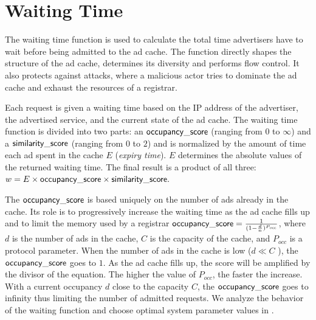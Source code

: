 
\section{Waiting Time}
\label{sec:waitingTime}

The waiting time function is used to calculate the total time advertisers have to wait before being admitted to the ad cache. 
The function directly shapes the structure of the ad cache, determines its diversity and performs flow control. 
It also protects against attacks, where a malicious actor tries to dominate the ad cache and exhaust the resources of a registrar. 

Each request is given a waiting time based on the IP address of the advertiser, the advertised service, and the current state of the ad cache.
The waiting time function is divided into two parts: an $\mathsf{occupancy\_score}$ (ranging from $0$ to $\infty$) and a $\mathsf{similarity\_score}$ (ranging from $0$ to $2$) and is normalized by the amount of time each ad spent in the cache $E$ (\ie \emph{expiry time}). $E$ determines the absolute values of the returned waiting time.  The final result is a product of all three: $w = E \times \mathsf{occupancy\_score} \times \mathsf{similarity\_score}.$

The $\mathsf{occupancy\_score}$ is based uniquely on the number of ads already in the cache.
Its role is to progressively increase the waiting time as the ad cache fills up and to limit the memory used by a registrar $\mathsf{occupancy\_score} = \frac{1}{(1-\frac{d}{n})^{P_\textit{occ}}}$,
where $d$ is the number of ads in the cache, $C$ is the capacity of the cache, and $P_\textit{occ}$ is a protocol parameter. 
When the number of ads in the cache is low ($d \ll  C$ ), the $\mathsf{occupancy\_score}$ goes to $1$. 
As the ad cache fills up, the score will be amplified by the divisor of the equation. 
The higher the value of $P_\textit{occ}$, the faster the increase. 
With a current occupancy $d$ close to the capacity $C$, the $\mathsf{occupancy\_score}$ goes to infinity thus limiting the number of admitted requests.
We analyze the behavior of the waiting function and choose optimal system parameter values in .


